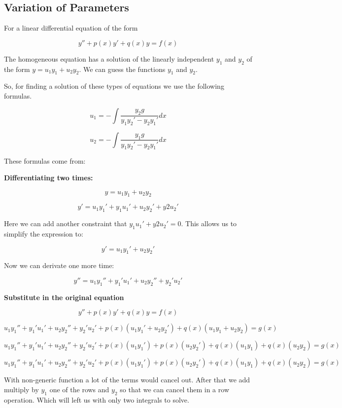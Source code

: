 \subsection{Variation of Parameters}

For a linear differential equation of the form

\[
    y'' + p(x)y' + q(x)y = f(x)
\]

The homogeneous equation has a solution of the linearly independent \(y_1\) and \(y_2\)
of the form \(y = u_1 y_1 + u_2 y_2\). We can guess the functions \(y_1\) and \(y_2\).
\vspace{\baselineskip}

So, for finding a solution of these types of equations we use the following formulas.

\[
    u_1 = - \int \frac{y_2 g}{y_1 y_{2}' - y_2 y_{1}'} dx
\]


\[
    u_2 = - \int \frac{y_1 g}{y_1 y_{2}' - y_2 y_{1}'} dx
\]

These formulas come from:
\vspace{\baselineskip}

\textbf{Differentiating two times:}

\[
    y = u_1 y_1 + u_2 y_2
\]

\[
    y' = u_1 y_{1}' + y_1 u_{1}' +  u_2 y_{2}' + y{2} u_{2}'
\]

Here we can add another constraint that \(y_1 u_{1}' + y{2} u_{2}' = 0\). This allows us to
simplify the expression to:

\[
    y' = u_1 y_{1}' +  u_2 y_{2}'
\]

Now we can derivate one more time:

\[
    y'' =  u_1 y_{1}'' + y_{1}' u_{1}'  + u_2 y_{2}'' + y_{2}' u_{2}'
\]


\textbf{Substitute in the original equation}

\[
    y'' + p(x)y' + q(x)y = f(x)
\]

\[
    u_1 y_{1}'' + y_{1}' u_{1}'  + u_2 y_{2}'' + y_{2}' u_{2}' + p(x)(u_1 y_{1}' +  u_2 y_{2}') 
    + q(x)(u_1 y_1 + u_2 y_2) = g(x)  
\]

\[
    u_1 y_{1}'' + y_{1}' u_{1}'  + u_2 y_{2}'' + y_{2}' u_{2}' + p(x)(u_1 y_{1}') + p(x)(u_2 y_{2}') 
    + q(x)(u_1 y_1) + q(x)(u_2 y_2) = g(x)  
\]

\[
    u_1 y_{1}'' + y_{1}' u_{1}'  + u_2 y_{2}'' + y_{2}' u_{2}' + p(x)(u_1 y_{1}') + p(x)(u_2 y_{2}') 
    + q(x)(u_1 y_1) + q(x)(u_2 y_2) = g(x)  
\]

With non-generic function a lot of the terms would cancel out. After that we add multiply by
\(y_1\) one of the rows and \(y_2\) so that we can cancel them in a row operation. Which will left us
with only two integrals to solve.


